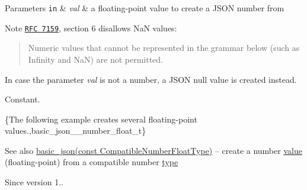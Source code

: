 \begin{DoxyParams}[1]{Parameters}
\mbox{\tt in}  & {\em val} & a floating-\/point value to create a J\+S\+ON number from\\
\hline
\end{DoxyParams}
\begin{DoxyNote}{Note}
\href{http://www.rfc-editor.org/rfc/rfc7159.txt}{\tt R\+FC 7159}, section 6 disallows NaN values\+: \begin{quote}
Numeric values that cannot be represented in the grammar below (such as Infinity and NaN) are not permitted. \end{quote}
In case the parameter {\itshape val} is not a number, a J\+S\+ON null value is created instead.
\end{DoxyNote}
Constant.

\{The following example creates several floating-\/point values.,basic\+\_\+json\+\_\+\+\_\+number\+\_\+float\+\_\+t\}

\begin{DoxySeeAlso}{See also}
\hyperlink{a00025_a4bbdfd6dd8d2e6fc9ac5d81ef61ba3fe}{basic\+\_\+json(const Compatible\+Number\+Float\+Type)} -- create a number \hyperlink{a00025_a0a2cbbd95862a623e7dc5c37e67dead0}{value} (floating-\/point) from a compatible number \hyperlink{a00025_a848cbae3bd3502ffbf738320bf5eb3aa}{type}
\end{DoxySeeAlso}
\begin{DoxySince}{Since}
version 1.. 
\end{DoxySince}
